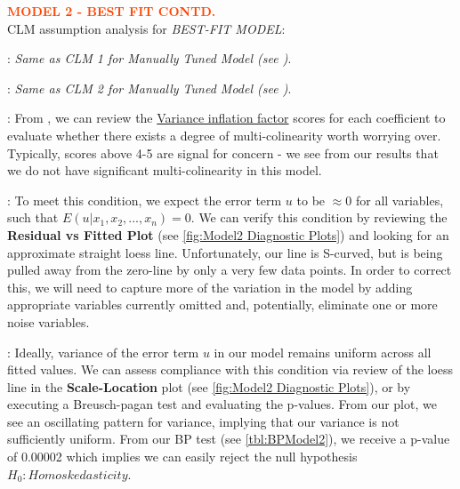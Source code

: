 \pagebreak

\textbf{\textcolor{OrangeRed}{MODEL 2 - BEST FIT CONTD.}}\\

CLM assumption analysis for \textit{BEST-FIT MODEL}:
\label{sec:BestFitModelCLM}

\begin{description}[font=$\bullet$~\normalfont\scshape\small\color{red!50!black}]
	\item [CLM 1 - Linear in parameters] {\fontsize{10}{10} \selectfont : \textit{Same as CLM 1 for Manually Tuned Model (see )}.}
	\item [CLM 2 - Random sampling] {\fontsize{10}{10} \selectfont : \textit{Same as CLM 2 for Manually Tuned Model (see )}.}
	\item [CLM 3 - No perfect multi-colinearity] {\fontsize{10}{10} \selectfont : From , we can review the \href{https://en.wikipedia.org/wiki/Variance_inflation_factor}{Variance inflation factor} scores for each coefficient to evaluate whether there exists a degree of multi-colinearity worth worrying over.  Typically, scores above 4-5 are signal for concern - we see from our results that we do not have significant multi-colinearity in this model.}
	\item [CLM 4 - Zero-conditional mean] {\fontsize{10}{10} \selectfont : To meet this condition, we expect the error term $u$ to be $\approx 0$ for all variables, such that $E(u|x_1,x_2,...,x_n) = 0$.  We can verify this condition by reviewing the \textbf{Residual vs Fitted Plot} (see \ref{fig:Model2 Diagnostic Plots}) and looking for an approximate straight loess line.  Unfortunately, our line is S-curved, but is being pulled away from the zero-line by only a very few data points.  In order to correct this, we will need to capture more of the variation in the model by adding appropriate variables currently omitted and, potentially, eliminate one or more noise variables.}
	\item [CLM 5 - Homoskedasticity] {\fontsize{10}{10} \selectfont : Ideally, variance of the error term $u$ in our model remains uniform across all fitted values.  We can assess compliance with this condition via review of the loess line in the \textbf{Scale-Location} plot (see \ref{fig:Model2 Diagnostic Plots}), or by executing a Breusch-pagan test and evaluating the p-values.  From our plot, we see an oscillating pattern for variance, implying that our variance is not sufficiently uniform.  From our BP test (see \ref{tbl:BPModel2}), we receive a p-value of 0.00002 which implies we can easily reject the null hypothesis $H_0 : Homoskedasticity$.}

\end{description}
